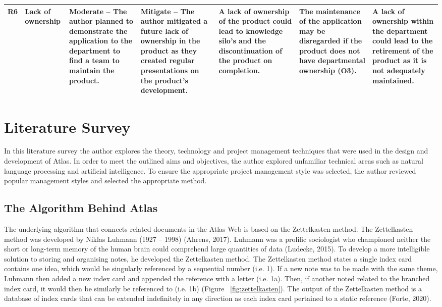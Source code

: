 \documentclass{article}
\begin{document}
\begin{landscape}
\begin{longtable}{|p{0.6cm}|p{2cm}|p{3.3cm}|p{3.3cm}|p{3cm}|p{3.5cm}|p{3.3cm}|}
\rowcolor[HTML]{FFC000} 
R6 &
  Lack of ownership &
  Moderate – The author planned to demonstrate the application to the department to find a team to maintain the product. &
  Mitigate – The author mitigated a future lack of ownership in the product as they created regular presentations on the product’s development. &
  A lack of ownership of the product could lead to knowledge silo’s and the   discontinuation of the product on completion. &
  The maintenance of the application may be disregarded if the product does not have departmental ownership (O3). &
  A lack of ownership within the department could lead to the retirement of the product as it is not adequately maintained. \\ \hline
\end{longtable}
\end{landscape}

\newpage

\section{Literature Survey}

In this literature survey the author explores the theory, technology and project management techniques that were used in the design and development of Atlas. In order to meet the outlined aims and objectives, the author explored unfamiliar technical areas such as natural language processing and artificial intelligence. To ensure the appropriate project management style was selected, the author reviewed popular management styles and selected the appropriate method.

\subsection{The Algorithm Behind Atlas}

The underlying algorithm that connects related documents in the Atlas Web is based on the Zettelkasten method. The Zettelkasten method was developed by Niklas Luhmann (1927 – 1998) (Ahrens, 2017). Luhmann was a prolific sociologist who championed neither the short or long-term memory of the human brain could comprehend large quantities of data (Ludecke, 2015). To develop a more intelligible solution to storing and organising notes, he developed the Zettelkasten method. The Zettelkasten method states a single index card contains one idea, which would be singularly referenced by a sequential number (i.e. 1). If a new note was to be made with the same theme, Luhmann then added a new index card and appended the reference with a letter (i.e. 1a). Then, if another noted related to the branched index card, it would then be similarly be referenced to (i.e. 1b) (Figure ~\ref{fig:zettelkasten}). The output of the Zettelkasten method is a database of index cards that can be extended indefinitely in any direction as each index card pertained to a static reference (Forte, 2020). 
\end{document}
